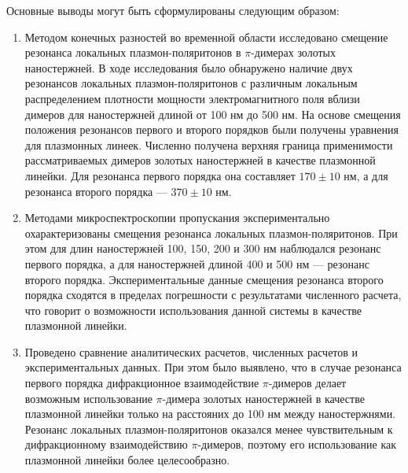 
Основные выводы могут быть сформулированы следующим образом:
\begin{enumerate}
\item Методом конечных разностей во временной области исследовано смещение резонанса локальных плазмон-поляритонов в $ \pi $-димерах золотых наностержней. В ходе исследования было обнаружено наличие двух резонансов локальных плазмон-поляритонов с различным локальным распределением плотности мощности электромагнитного поля вблизи димеров для наностержней длиной от 100 нм до 500 нм. На основе смещения положения резонансов первого и второго порядков были получены уравнения для плазмонных линеек. Численно получена верхняя граница применимости рассматриваемых димеров золотых наностержней в качестве плазмонной линейки. Для резонанса первого порядка она составляет $  170 \pm 10 $ нм, а для резонанса второго порядка --- $ 370 \pm 10 $ нм.
\item Методами микроспектроскопии пропускания экспериментально охарактеризованы смещения резонанса локальных плазмон-поляритонов.  При этом для длин наностержней 100, 150, 200 и 300 нм наблюдался резонанс первого порядка, а для наностержней длиной 400 и 500 нм --- резонанс второго порядка. Экспериментальные данные смещения резонанса второго порядка сходятся в пределах погрешности с результатами численного расчета, что говорит о возможности использования данной системы в качестве плазмонной линейки. 
\item Проведено сравнение аналитических расчетов, численных расчетов и экспериментальных данных. При этом было выявлено, что в случае резонанса первого порядка дифракционное взаимодействие $ \pi $-димеров делает возможным использование $ \pi $-димера золотых наностержней в качестве плазмонной линейки только на расстояних до 100 нм между наностержнями. Резонанс локальных плазмон-поляритонов оказался менее чувствительным к дифракционному взаимодействию $ \pi $-димеров, поэтому его использование как плазмонной линейки более целесообразно.

\end{enumerate}